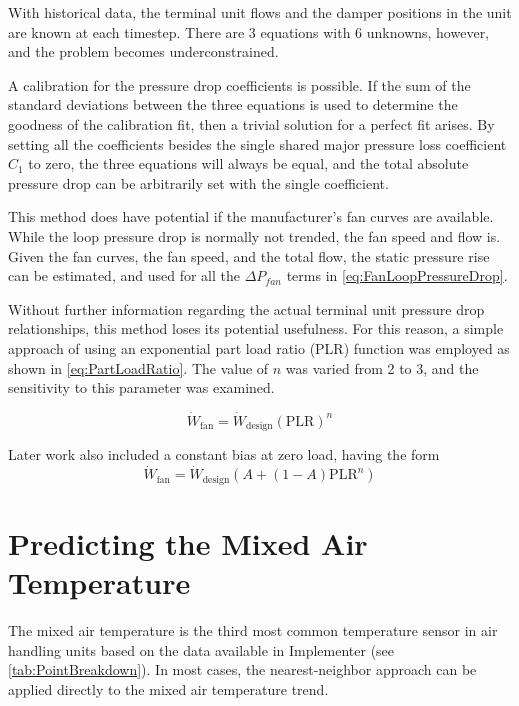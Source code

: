 With historical data, the terminal unit flows and the
damper positions in the unit are known at each timestep. There are 3 equations with 6
unknowns, however, and the problem becomes underconstrained.

A calibration for the pressure drop coefficients is possible. If the sum
of the standard deviations between the three equations is used to
determine the goodness of the calibration fit, then a trivial solution
for a perfect fit arises. By setting all the coefficients besides the
single shared major pressure loss coefficient \(C_1\) to zero, the three
equations will always be equal, and the total absolute pressure drop can
be arbitrarily set with the single coefficient.

This method does have potential if the manufacturer's fan curves are
available. While the loop pressure drop is normally not trended, the fan
speed and flow is. Given the fan curves, the fan speed, and the total
flow, the static pressure rise can be estimated, and used for all the
\(\Delta P_{fan} \) terms in  \ref{eq:FanLoopPressureDrop}.

Without further information regarding the actual terminal unit pressure
drop relationships, this method loses its potential usefulness. For this
reason, a simple approach of using an exponential part load ratio (PLR)
function was employed as shown in  \ref{eq:PartLoadRatio}. The value
of \(n\) was varied from 2 to 3, and the sensitivity to this parameter was
examined.


\begin{equation}\label{eq:PartLoadRatio}
    \dot{W}_{\text{fan}} = \dot{W}_{\text{design}} \left(\text{PLR}\right)^n
\end{equation}

Later work also included a constant bias at zero load, having the form
\begin{equation}
    \dot{W}_{\text{fan}} = \dot{W}_{\text{design}} \left(A +
    \left(1-A\right)\text{PLR}^{n}\right)
\end{equation}

\section{Predicting the Mixed Air Temperature}

The mixed air temperature is the third most common temperature sensor in
air handling units based on the data available in Implementer
(see \tableref{} \ref{tab:PointBreakdown}). In most cases, the nearest-neighbor
approach can be applied directly to the mixed air temperature trend.


